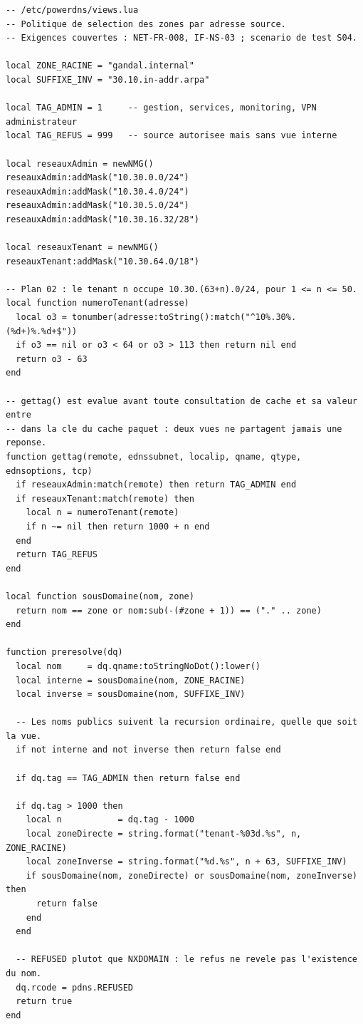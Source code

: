 \begin{lstlisting}[language=luapdns,caption={Politique de sélection des zones
  appliquée sur rec1 et rec2},label=lst:views]
-- /etc/powerdns/views.lua
-- Politique de selection des zones par adresse source.
-- Exigences couvertes : NET-FR-008, IF-NS-03 ; scenario de test S04.

local ZONE_RACINE = "gandal.internal"
local SUFFIXE_INV = "30.10.in-addr.arpa"

local TAG_ADMIN = 1     -- gestion, services, monitoring, VPN administrateur
local TAG_REFUS = 999   -- source autorisee mais sans vue interne

local reseauxAdmin = newNMG()
reseauxAdmin:addMask("10.30.0.0/24")
reseauxAdmin:addMask("10.30.4.0/24")
reseauxAdmin:addMask("10.30.5.0/24")
reseauxAdmin:addMask("10.30.16.32/28")

local reseauxTenant = newNMG()
reseauxTenant:addMask("10.30.64.0/18")

-- Plan 02 : le tenant n occupe 10.30.(63+n).0/24, pour 1 <= n <= 50.
local function numeroTenant(adresse)
  local o3 = tonumber(adresse:toString():match("^10%.30%.(%d+)%.%d+$"))
  if o3 == nil or o3 < 64 or o3 > 113 then return nil end
  return o3 - 63
end

-- gettag() est evalue avant toute consultation de cache et sa valeur entre
-- dans la cle du cache paquet : deux vues ne partagent jamais une reponse.
function gettag(remote, ednssubnet, localip, qname, qtype, ednsoptions, tcp)
  if reseauxAdmin:match(remote) then return TAG_ADMIN end
  if reseauxTenant:match(remote) then
    local n = numeroTenant(remote)
    if n ~= nil then return 1000 + n end
  end
  return TAG_REFUS
end

local function sousDomaine(nom, zone)
  return nom == zone or nom:sub(-(#zone + 1)) == ("." .. zone)
end

function preresolve(dq)
  local nom     = dq.qname:toStringNoDot():lower()
  local interne = sousDomaine(nom, ZONE_RACINE)
  local inverse = sousDomaine(nom, SUFFIXE_INV)

  -- Les noms publics suivent la recursion ordinaire, quelle que soit la vue.
  if not interne and not inverse then return false end

  if dq.tag == TAG_ADMIN then return false end

  if dq.tag > 1000 then
    local n           = dq.tag - 1000
    local zoneDirecte = string.format("tenant-%03d.%s", n, ZONE_RACINE)
    local zoneInverse = string.format("%d.%s", n + 63, SUFFIXE_INV)
    if sousDomaine(nom, zoneDirecte) or sousDomaine(nom, zoneInverse) then
      return false
    end
  end

  -- REFUSED plutot que NXDOMAIN : le refus ne revele pas l'existence du nom.
  dq.rcode = pdns.REFUSED
  return true
end
\end{lstlisting}

